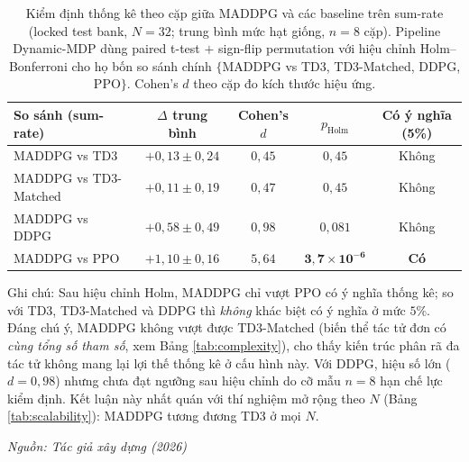 \begin{table}[t]
\centering
\small
\caption{Kiểm định thống kê theo cặp giữa MADDPG và các baseline trên sum-rate (locked test bank, $N=32$; trung bình mức hạt giống, $n=8$ cặp). Pipeline Dynamic-MDP dùng paired t-test $+$ sign-flip permutation với hiệu chỉnh Holm--Bonferroni cho họ bốn so sánh chính $\{$MADDPG vs TD3, TD3-Matched, DDPG, PPO$\}$. Cohen's $d$ theo cặp đo kích thước hiệu ứng.}
\label{tab:significance}
\begin{tabular}{lcccc}
\toprule
\textbf{So sánh (sum-rate)} & \textbf{$\Delta$ trung bình} & \textbf{Cohen's $d$} & \textbf{$p_{\text{Holm}}$} & \textbf{Có ý nghĩa (5\%)} \\
\midrule
MADDPG vs TD3         & $+0{,}13 \pm 0{,}24$ & $0{,}45$ & $0{,}45$ & Không \\
MADDPG vs TD3-Matched & $+0{,}11 \pm 0{,}19$ & $0{,}47$ & $0{,}45$ & Không \\
MADDPG vs DDPG        & $+0{,}58 \pm 0{,}49$ & $0{,}98$ & $0{,}081$ & Không \\
MADDPG vs PPO         & $+1{,}10 \pm 0{,}16$ & $5{,}64$ & $\mathbf{3{,}7 \times 10^{-6}}$ & \textbf{Có} \\
\bottomrule
\end{tabular}

\vspace{0.2em}
{\footnotesize Ghi chú: Sau hiệu chỉnh Holm, MADDPG chỉ vượt PPO có ý nghĩa thống kê; so với TD3, TD3-Matched và DDPG thì \emph{không} khác biệt có ý nghĩa ở mức $5\%$. Đáng chú ý, MADDPG không vượt được TD3-Matched (biến thể tác tử đơn có \emph{cùng tổng số tham số}, xem Bảng \ref{tab:complexity}), cho thấy kiến trúc phân rã đa tác tử không mang lại lợi thế thống kê ở cấu hình này. Với DDPG, hiệu số lớn ($d=0{,}98$) nhưng chưa đạt ngưỡng sau hiệu chỉnh do cỡ mẫu $n=8$ hạn chế lực kiểm định. Kết luận này nhất quán với thí nghiệm mở rộng theo $N$ (Bảng \ref{tab:scalability}): MADDPG tương đương TD3 ở mọi $N$.\par}
\hfill {\footnotesize\itshape Nguồn: Tác giả xây dựng (2026)}
\end{table}
